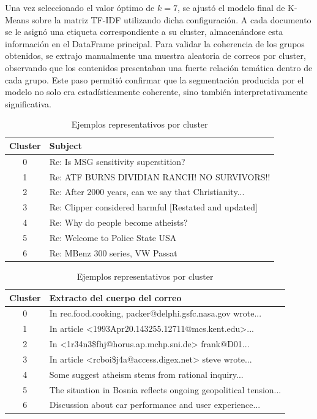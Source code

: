 \documentclass[journal]{IEEEtran}
\begin{document}
\vspace{12pt}
Una vez seleccionado el valor óptimo de $k=7$, se ajustó el modelo final de K-Means sobre la matriz TF-IDF utilizando dicha configuración. A cada documento se le asignó una etiqueta correspondiente a su cluster, almacenándose esta información en el DataFrame principal. Para validar la coherencia de los grupos obtenidos, se extrajo manualmente una muestra aleatoria de correos por cluster, observando que los contenidos presentaban una fuerte relación temática dentro de cada grupo. Este paso permitió confirmar que la segmentación producida por el modelo no solo era estadísticamente coherente, sino también interpretativamente significativa.

\begin{table}[H]
\centering
\caption{Ejemplos representativos por cluster}
\label{tab:ejemplos-clusters}
\begin{tabular}{|c|p{5cm}|}
\hline
\textbf{Cluster} & \textbf{Subject} \\
\hline
0 & Re: Is MSG sensitivity superstition? \\
1 & Re: ATF BURNS DIVIDIAN RANCH! NO SURVIVORS!! \\
2 & Re: After 2000 years, can we say that Christianity... \\
3 & Re: Clipper considered harmful [Restated and updated] \\
4 & Re: Why do people become atheists? \\
5 & Re: Welcome to Police State USA \\
6 & Re: MBenz 300 series, VW Passat \\
\hline
\end{tabular}

\vspace{0.5em}

\begin{tabular}{|c|p{5.7cm}|}
\hline
\textbf{Cluster} & \textbf{Extracto del cuerpo del correo} \\
\hline
0 & In rec.food.cooking, packer@delphi.gsfc.nasa.gov wrote... \\
1 & In article \textless{}1993Apr20.143255.12711@mcs.kent.edu\textgreater{}... \\
2 & In \textless{}1r34n3\$fhj@horus.ap.mchp.sni.de\textgreater{} frank@D01... \\
3 & In article \textless{}rcboi\$j4a@access.digex.net\textgreater{} steve wrote... \\
4 & Some suggest atheism stems from rational inquiry... \\
5 & The situation in Bosnia reflects ongoing geopolitical tension... \\
6 & Discussion about car performance and user experience... \\
\hline
\end{tabular}
\end{table}
\end{document}
